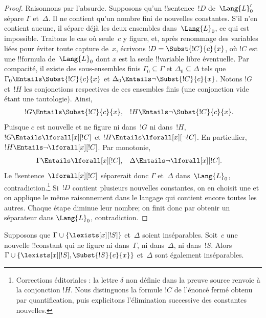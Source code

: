 \documentclass[../../../include/open-logic-section]{subfiles}
\begin{document}
\begin{proof}
Raisonnons par l'absurde. Supposons qu'un
!!{sentence}~$!D$ de~$\Lang{L}'_0$
sépare $\Gamma$ et~$\Delta$.
Il ne contient qu'un nombre fini de
nouvelles constantes. S'il n'en contient
aucune, il sépare déjà les deux ensembles
dans~$\Lang{L}_0$, ce qui est impossible.
Traitons le cas où seule~$c$ y figure,
et, après renommage des variables liées pour éviter toute capture de~$x$, écrivons
$!D=\Subst{!C}{c}{x}$,
où $!C$ est une !!{formula} de~$\Lang{L}_0$
dont $x$ est la seule !!{variable} libre
éventuelle.
Par compacité, il existe des sous-ensembles
finis $\Gamma_0\subseteq\Gamma$ et
$\Delta_0\subseteq\Delta$ tels que
$\Gamma_0\Entails\Subst{!C}{c}{x}$
et
$\Delta_0\Entails\lnot\Subst{!C}{c}{x}$.
Notons $!G$ et~$!H$ les conjonctions
respectives de ces ensembles finis
(une conjonction vide étant une tautologie).
Ainsi,
\begin{align*}
  !G &\Entails\Subst{!C}{c}{x},
  &
  !H &\Entails\lnot\Subst{!C}{c}{x}.
\end{align*}
Puisque $c$ est nouvelle et ne figure
ni dans~$!G$ ni dans~$!H$,
$!G\Entails\lforall[x][!C]$ et
$!H\Entails\lforall[x][\lnot !C]$.
En particulier,
$!H\Entails\lnot\lforall[x][!C]$.
Par monotonie,
\begin{align*}
  \Gamma &\Entails\lforall[x][!C],
  &
  \Delta &\Entails\lnot\lforall[x][!C].
\end{align*}
Le !!{sentence}~$\lforall[x][!C]$
séparerait donc $\Gamma$ et~$\Delta$
dans~$\Lang{L}_0$, contradiction.\footnote{Corrections éditoriales : la lettre $\delta$ non définie dans la preuve source renvoie à la conjonction $!H$. Nous distinguons la formule $!C$ de l'énoncé fermé obtenu par quantification, puis explicitons l'élimination successive des constantes nouvelles.}
Si~$!D$ contient plusieurs nouvelles
constantes, on en choisit une et
on applique le même raisonnement
dans le langage qui contient encore
toutes les autres. Chaque étape
diminue leur nombre; on finit donc
par obtenir un séparateur dans
$\Lang{L}_0$, contradiction.
\end{proof}

\begin{lem}
Supposons que
$\Gamma\cup\{\lexists[x][!S]\}$
et~$\Delta$ soient inséparables.
Soit~$c$ une nouvelle !!{constant}
qui ne figure ni dans~$\Gamma$,
ni dans~$\Delta$, ni dans~$!S$.
Alors
$\Gamma\cup
\{\lexists[x][!S],\Subst{!S}{c}{x}\}$
et~$\Delta$ sont également inséparables.
\end{lem}
\end{document}
